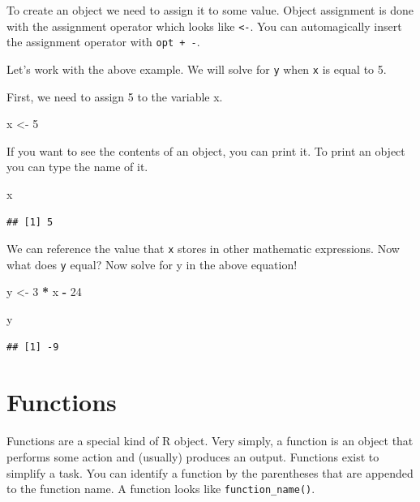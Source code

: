 \documentclass[
]{book}
\newenvironment{Shaded}{\begin{snugshade}}{\end{snugshade}}
\newcommand{\DecValTok}[1]{\textcolor[rgb]{0.00,0.00,0.81}{#1}}
\newcommand{\NormalTok}[1]{#1}
\newcommand{\OperatorTok}[1]{\textcolor[rgb]{0.81,0.36,0.00}{\textbf{#1}}}
\newcommand{\StringTok}[1]{\textcolor[rgb]{0.31,0.60,0.02}{#1}}
\begin{document}
To create an object we need to assign it to some value. Object assignment is done with the assignment operator which looks like \texttt{\textless{}-}. You can automagically insert the assignment operator with \texttt{opt\ +\ -}.

Let's work with the above example. We will solve for \texttt{y} when \texttt{x} is equal to 5.

First, we need to assign 5 to the variable x.

\begin{Shaded}
\begin{Highlighting}[]
\NormalTok{x \textless{}{-}}\StringTok{ }\DecValTok{5}
\end{Highlighting}
\end{Shaded}

If you want to see the contents of an object, you can print it. To print an object you can type the name of it.

\begin{Shaded}
\begin{Highlighting}[]
\NormalTok{x}
\end{Highlighting}
\end{Shaded}

\begin{verbatim}
## [1] 5
\end{verbatim}

We can reference the value that \texttt{x} stores in other mathematic expressions. Now what does \texttt{y} equal? Now solve for y in the above equation!

\begin{Shaded}
\begin{Highlighting}[]
\NormalTok{y \textless{}{-}}\StringTok{ }\DecValTok{3} \OperatorTok{*}\StringTok{ }\NormalTok{x }\OperatorTok{{-}}\StringTok{ }\DecValTok{24}

\NormalTok{y}
\end{Highlighting}
\end{Shaded}

\begin{verbatim}
## [1] -9
\end{verbatim}

\hypertarget{functions}{%
\section{Functions}\label{functions}}

Functions are a special kind of R object. Very simply, a function is an object that performs some action and (usually) produces an output. Functions exist to simplify a task. You can identify a function by the parentheses that are appended to the function name. A function looks like \texttt{function\_name()}.
\end{document}

